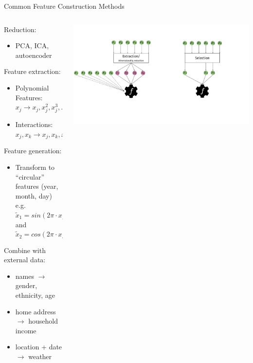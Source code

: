 \begin{frame}{Common Feature Construction Methods}
  \begin{columns}
    \begin{column}{0.6\textwidth}
    Reduction:
    \begin{itemize}
      \item PCA, ICA, autoencoder
    \end{itemize}

    Feature extraction:
    \begin{itemize}
      \item Polynomial Features: $x_j \longrightarrow x_j, x_j^2, x_j^3, ...$
      \item Interactions: $x_j, x_k \longrightarrow x_j, x_k, x_j \cdot x_k$
    \end{itemize}

    Feature generation:
    \begin{itemize}
      \item Transform to ``circular'' features (year, month, day) \\
      e.g.\ $\tilde x_1 = sin(2\pi \cdot x /24)$ and $\tilde x_2 = cos(2\pi \cdot x /24)$
    \end{itemize}
    
    Combine with external data:
    \begin{itemize}
      \item names $\longrightarrow$ gender, ethnicity, age
      \item home address $\longrightarrow$ household income
      \item location + date $\longrightarrow$ weather
    \end{itemize}

    \end{column}%
    \begin{column}{0.4\textwidth}
      \begin{center}
        \includegraphics[width= \textwidth, trim=0 100 390 60, clip]{images/feat_extr_vs_selection.pdf}
      \end{center}
    \end{column}
  \end{columns}
    
\end{frame}


